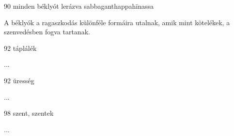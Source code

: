 
\begin{notesdescription}

\item[{90}
{minden béklyót lerázva}
{sabbaganthappahīnassa}] \hfill\par

A béklyók a ragaszkodás különféle formáira utalnak, amik mint kötelékek, a szenvedésben fogva tartanak.

\item[{92}
{táplálék}
{}] \hfill\par

...

\item[{92}
{üresség}
{}] \hfill\par

...

\item[{98}
{szent, szentek}
{}] \hfill\par

...

\end{notesdescription}


